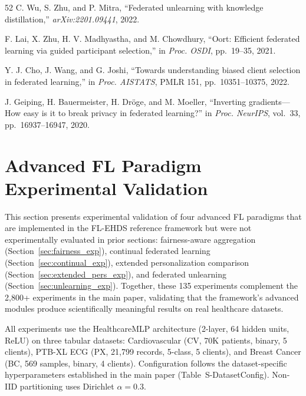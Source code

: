 \documentclass[conference]{IEEEtran}
\begin{document}
\begin{thebibliography}{52}
C. Wu, S. Zhu, and P. Mitra, ``Federated unlearning with knowledge distillation,'' \textit{arXiv:2201.09441}, 2022.

F. Lai, X. Zhu, H. V. Madhyastha, and M. Chowdhury, ``Oort: Efficient federated learning via guided participant selection,'' in \textit{Proc. OSDI}, pp.~19--35, 2021.

Y. J. Cho, J. Wang, and G. Joshi, ``Towards understanding biased client selection in federated learning,'' in \textit{Proc. AISTATS}, PMLR 151, pp.~10351--10375, 2022.


J. Geiping, H. Bauermeister, H. Dr\"oge, and M. Moeller, ``Inverting gradients---How easy is it to break privacy in federated learning?'' in \textit{Proc. NeurIPS}, vol.~33, pp.~16937--16947, 2020.

\end{thebibliography}

\section{Advanced FL Paradigm Experimental Validation}
\label{sec:cascade4}

This section presents experimental validation of four advanced FL paradigms that are implemented in the FL-EHDS reference framework but were not experimentally evaluated in prior sections: fairness-aware aggregation (Section~\ref{sec:fairness_exp}), continual federated learning (Section~\ref{sec:continual_exp}), extended personalization comparison (Section~\ref{sec:extended_pers_exp}), and federated unlearning (Section~\ref{sec:unlearning_exp}). Together, these 135 experiments complement the 2,800+ experiments in the main paper, validating that the framework's advanced modules produce scientifically meaningful results on real healthcare datasets.

All experiments use the HealthcareMLP architecture (2-layer, 64 hidden units, ReLU) on three tabular datasets: Cardiovascular (CV, 70K patients, binary, 5 clients), PTB-XL ECG (PX, 21,799 records, 5-class, 5 clients), and Breast Cancer (BC, 569 samples, binary, 4 clients). Configuration follows the dataset-specific hyperparameters established in the main paper (Table~S-DatasetConfig). Non-IID partitioning uses Dirichlet $\alpha{=}0.3$.
\end{document}
